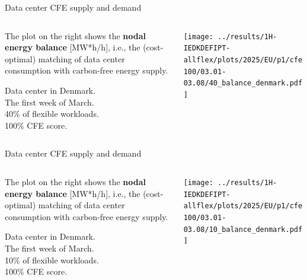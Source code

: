 \begin{frame}{Data center CFE supply and demand}
  \label{nb2-40}

  {\footnotesize
  
  \begin{columns}[T]
    \begin{column}{3.5cm}
      \vspace{0.3cm}
      The plot on the right shows the {\bf nodal energy balance} [MW*h/h], i.e., the (cost-optimal) matching of data center consumption with carbon-free energy supply.

      \vspace{0.2cm}
      Data center in Denmark. \\
      The first week of March. \\
      40\% of flexible workloads.\\
      100\% CFE score.\\
    \end{column}
  
    \begin{column}{11cm}
      \texttt{[image: ../results/1H-IEDKDEFIPT-allflex/plots/2025/EU/p1/cfe100/03.01-03.08/40\_balance\_denmark.pdf]}
    \end{column}
    \end{columns}
    } 

\end{frame}


\begin{frame}{Data center CFE supply and demand}
  \label{nb2-10}

  {\footnotesize
  
  \begin{columns}[T]
    \begin{column}{3.5cm}
      \vspace{0.3cm}
      The plot on the right shows the {\bf nodal energy balance} [MW*h/h], i.e., the (cost-optimal) matching of data center consumption with carbon-free energy supply.

      \vspace{0.2cm}
      Data center in Denmark. \\
      The first week of March. \\
      10\% of flexible workloads.\\
      100\% CFE score.\\
    \end{column}
  
    \begin{column}{11cm}
      \texttt{[image: ../results/1H-IEDKDEFIPT-allflex/plots/2025/EU/p1/cfe100/03.01-03.08/10\_balance\_denmark.pdf]}
    \end{column}
    \end{columns}
    } 

\end{frame}


